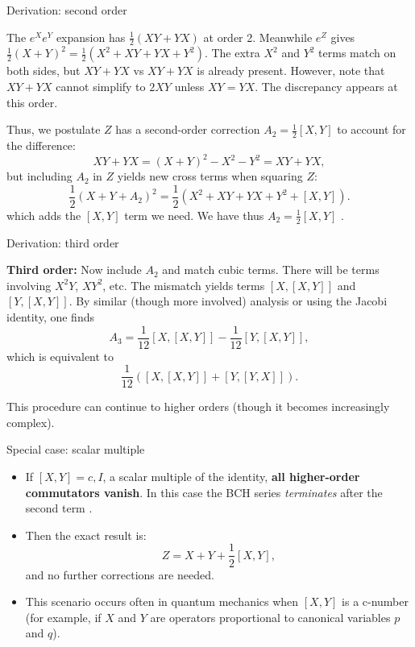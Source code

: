\documentclass{beamer}
\begin{document}
\begin{frame}{Derivation: second order}

The $e^X e^Y$ expansion has $\frac{1}{2}(XY + YX)$ at order 2. Meanwhile $e^Z$ gives $\frac{1}{2}(X+Y)^2 = \frac{1}{2}(X^2 + XY + YX + Y^2)$. The extra $X^2$ and $Y^2$ terms match on both sides, but $XY+YX$ vs $XY+YX$ is already present. However, note that $XY + YX$ cannot simplify to $2XY$ unless $XY=YX$. The discrepancy appears at this order.


Thus, we postulate $Z$ has a second-order correction $A_2 = \frac{1}{2}[X,Y]$ to account for the difference:
\[  
XY + YX = (X+Y)^2 - X^2 - Y^2 = XY + YX,
\]
but including $A_2$ in $Z$ yields new cross terms when squaring $Z$:
\[
\frac{1}{2}(X+Y+A_2)^2 = \frac{1}{2}(X^2 + XY+YX + Y^2 + [X,Y]).
\]
which adds the $[X,Y]$ term we need. We have thus $A_2 = \frac{1}{2}[X,Y]$ .
\end{frame}



\begin{frame}{Derivation: third order}

\textbf{Third order:} Now include $A_2$ and match cubic terms. There will be terms involving $X^2Y$, $XY^2$, etc. The mismatch yields terms $[X,[X,Y]]$ and $[Y,[X,Y]]$. By similar (though more involved) analysis or using the Jacobi identity, one finds
\[
A_3 = \frac{1}{12}[X,[X,Y]] - \frac{1}{12}[Y,[X,Y]], 
\]
which is equivalent to
\[
\frac{1}{12}([X,[X,Y]] + [Y,[Y,X]]).
\]

This procedure can continue to higher orders (though it becomes increasingly complex).

\end{frame}


\begin{frame}{Special case: scalar multiple}

  \begin{itemize}
\item If $[X,Y] = c,I$, a scalar multiple of the identity, \textbf{all higher-order commutators vanish}. In this case the BCH series \emph{terminates} after the second term .
\item Then the exact result is:
\[  
Z = X + Y + \frac{1}{2}[X,Y],
\]
and no further corrections are needed.
\item This scenario occurs often in quantum mechanics when $[X,Y]$ is a c-number (for example, if $X$ and $Y$ are operators proportional to canonical variables $p$ and $q$).
\end{itemize}
\end{frame}
\end{document}
